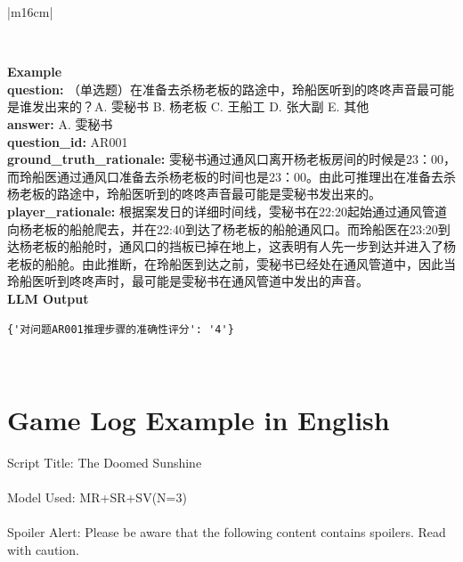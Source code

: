 \documentclass[11pt]{article}
\begin{document}
{\begin{CJK}{UTF8}{gbsn}
\begin{table}[th!]
\begin{minipage}{\textwidth}
\begin{tabular}{|m{16cm}|}
\begin{minipage}[t]{\linewidth}
\begin{verbatim}
\end{verbatim}
\end{minipage} \\
\hline
{}  \textbf{Example}  \\
 \textbf{  question:} \small（单选题）在准备去杀杨老板的路途中，玲船医听到的咚咚声音最可能是谁发出来的？A. 雯秘书 B. 杨老板 C. 王船工 D. 张大副 E. 其他\\
  \textbf{  answer:} \small A. 雯秘书\\
  \textbf{  question\_id:} \small AR001\\
    \textbf{  ground\_truth\_rationale:} \small 雯秘书通过通风口离开杨老板房间的时候是23：00，而玲船医通过通风口准备去杀杨老板的时间也是23：00。由此可推理出在准备去杀杨老板的路途中，玲船医听到的咚咚声音最可能是雯秘书发出来的。\\
        \textbf{  player\_rationale:} \small 根据案发日的详细时间线，雯秘书在22:20起始通过通风管道向杨老板的船舱爬去，并在22:40到达了杨老板的船舱通风口。而玲船医在23:20到达杨老板的船舱时，通风口的挡板已掉在地上，这表明有人先一步到达并进入了杨老板的船舱。由此推断，在玲船医到达之前，雯秘书已经处在通风管道中，因此当玲船医听到咚咚声时，最可能是雯秘书在通风管道中发出的声音。\\
\hline
{}  \textbf{LLM Output}  \\
\hline
\begin{minipage}[t]{\linewidth}
\small\begin{verbatim}
{'对问题AR001推理步骤的准确性评分': '4'}

\end{verbatim}
\end{minipage} \\
\hline
\end{tabular}
\end{minipage}

\caption{LLM prompts and outputs for inferential question answering and automatic evaluation.}
\label{table:prompt_inferential_qa_eval_cn}
\end{table}
\end{CJK}

\clearpage
\newpage
\section{Game Log Example in English}

Script Title: The Doomed Sunshine\\\\
Model Used: MR+SR+SV(N=3)\\\\
Spoiler Alert: Please be aware that the following content contains spoilers. Read with caution.\\

}
\end{document}

